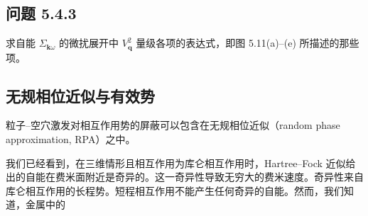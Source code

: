 \subsection*{问题 5.4.3}

求自能 $\Sigma_{\pmb{k}\omega}$ 的微扰展开中 $V_{\pmb{q}}^{2}$ 量级各项的表达式，即图 5.11(a)--(e) 所描述的那些项。

\subsection{无规相位近似与有效势}

\begin{keypoints}
\item 粒子--空穴激发对相互作用势的屏蔽可以包含在无规相位近似（random phase approximation, RPA）之中。
\end{keypoints}

我们已经看到，在三维情形且相互作用为库仑相互作用时，Hartree--Fock 近似给出的自能在费米面附近是奇异的。这一奇异性导致无穷大的费米速度。奇异性来自库仑相互作用的长程势。短程相互作用不能产生任何奇异的自能。然而，我们知道，金属中的
